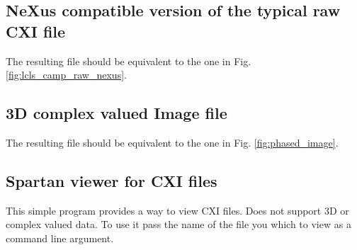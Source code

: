 \documentclass[usletter,11pt]{article}
\begin{document}
\clearpage
\subsection{NeXus compatible version of the typical raw CXI file}

The resulting file should be equivalent to the one in
Fig. \ref{fig:lcls_camp_raw_nexus}.

\clearpage
\subsection{3D complex valued Image file}

The resulting file should be equivalent to the one in Fig. \ref{fig:phased_image}.

\clearpage
\subsection{Spartan viewer for CXI files}

This simple program provides a way to view CXI files. Does not support
3D or complex valued data. To use it pass the name of the file
you which to view as a command line argument.
\end{document}
